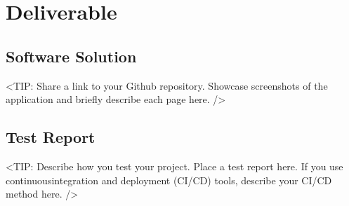 \chapter{Deliverable}
\label{chap:deliverable}

\section{Software Solution}
\label{section:software-solution}
<TIP: Share a link to your Github repository. Showcase screenshots
of the application and briefly describe each page here. />

\section{Test Report}
\label{section:test-report}
<TIP: Describe how you test your project. Place a test report here.
If you use continuousintegration and deployment (CI/CD) tools, describe your
CI/CD method here. />